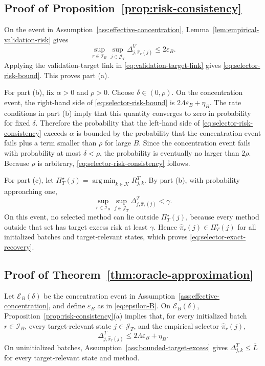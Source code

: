 \documentclass[a4paper, 12pt]{article}
\theoremstyle{plain}
\theoremstyle{remark}
\DeclareMathOperator*{\argmin}{arg\,min}
\newcommand{\Kcal}{\mathcal{K}}
\newcommand{\1}{\mathbf{1}}
\begin{document}
\subsection*{Proof of Proposition~\ref{prop:risk-consistency}}
On the event in Assumption~\ref{ass:effective-concentration}, Lemma~\ref{lem:empirical-validation-risk} gives
\begin{equation*}
    \sup_{r\in\mathcal I_B}\sup_{j\in\mathcal J_T}
    \Delta^V_{j,\widehat\pi_r(j)}
    \leq 2\varepsilon_B .
\end{equation*}
Applying the validation-target link in \eqref{eq:validation-target-link} gives \eqref{eq:selector-risk-bound}. This proves part (a).

For part (b), fix \(\alpha>0\) and \(\rho>0\). Choose \(\delta\in(0,\rho)\). On the concentration event, the right-hand side of \eqref{eq:selector-risk-bound} is \(2\Lambda\varepsilon_B+\eta_B\). The rate conditions in part (b) imply that this quantity converges to zero in probability for fixed \(\delta\). Therefore the probability that the left-hand side of \eqref{eq:selector-risk-consistency} exceeds \(\alpha\) is bounded by the probability that the concentration event fails plus a term smaller than \(\rho\) for large \(B\). Since the concentration event fails with probability at most \(\delta<\rho\), the probability is eventually no larger than \(2\rho\). Because \(\rho\) is arbitrary, \eqref{eq:selector-risk-consistency} follows.

For part (c), let \(\Pi_T^\star(j)=\argmin_{k\in\Kcal}R^T_{j,k}\). By part (b), with probability approaching one,
\begin{equation*}
    \sup_{r\in\mathcal I_B}\sup_{j\in\mathcal J_T}
    \Delta^T_{j,\widehat\pi_r(j)}<\gamma .
\end{equation*}
On this event, no selected method can lie outside \(\Pi_T^\star(j)\), because every method outside that set has target excess risk at least \(\gamma\). Hence \(\widehat\pi_r(j)\in\Pi_T^\star(j)\) for all initialized batches and target-relevant states, which proves \eqref{eq:selector-exact-recovery}.

\subsection*{Proof of Theorem~\ref{thm:oracle-approximation}}
Let \(\mathcal E_B(\delta)\) be the concentration event in Assumption~\ref{ass:effective-concentration}, and define \(\varepsilon_B\) as in \eqref{eq:epsilon-B}. On \(\mathcal E_B(\delta)\), Proposition~\ref{prop:risk-consistency}(a) implies that, for every initialized batch \(r\in\mathcal I_B\), every target-relevant state \(j\in\mathcal J_T\), and the empirical selector \(\widehat\pi_r(j)\),
\begin{equation*}
    \Delta^T_{j,\widehat\pi_r(j)}
    \leq
    2\Lambda\varepsilon_B+\eta_B .
\end{equation*}
On uninitialized batches, Assumption~\ref{ass:bounded-target-excess} gives \(\Delta^T_{j,k}\leq\bar L\) for every target-relevant state and method.
\end{document}
